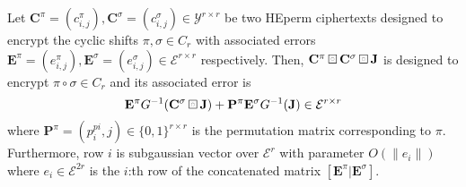 \begin{theorem}\label{thm:HEPerm_product}
    Let $\mathbf{C}^{\pi} = (c^{\pi}_{i,j}), \mathbf{C}^{\sigma} = (c^{\sigma}_{i,j}) \in \mathcal{Y}^{r \times r}$ be two HEperm ciphertexts designed to encrypt the cyclic shifts $\pi, \sigma \in C_r$ with associated errors $\mathbf{E}^{\pi} = (e^{\pi}_{i,j}), \mathbf{E}^{\sigma} = (e^{\sigma}_{i,j}) \in \mathcal{E}^{r \times r}$ respectively. Then, $\mathbf{C}^{\pi} \boxring \mathbf{C}^{\sigma} \boxring \mathbf{J}$ is designed to encrypt $\pi \circ \sigma \in C_r$ and its associated error is
    \begin{equation}
        \mathbf{E}^{\pi} G^{-1}(\mathbf{C}^\sigma \boxring \mathbf{J}) + \mathbf{P}^{\pi} \mathbf{E}^{\sigma}G^{-1}(\mathbf{J}) \in \mathcal{E}^{r \times r} 
    \end{equation}
    where $\mathbf{P}^{\pi} = (p^{pi}_i,j) \in \{0,1\}^{r \times r}$ is the permutation matrix corresponding to $\pi$. Furthermore, row $i$ is subgaussian vector over $\mathcal{E}^r$ with parameter $O(\|e_i\|)$ where $e_i \in \mathcal{E}^{2r}$ is the $i$:th row of the concatenated matrix $[\mathbf{E}^{\pi} | \mathbf{E}^{\sigma}]$. 
\end{theorem}
